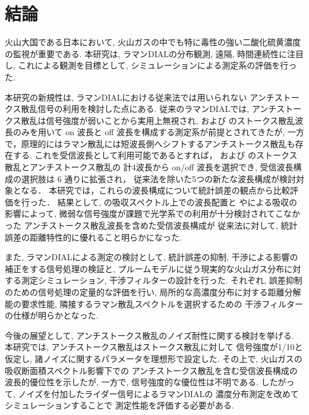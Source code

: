 { \setlength{\parskip}{0.7em}

\chapter[結論]{結論}\label{chapt6}

火山大国である日本において, 
火山ガスの中でも特に毒性の強い二酸化硫黄濃度の監視が重要である. 
本研究は, ラマンDIALの分布観測, 遠隔, 時間連続性に注目し, 
これによる観測を目標として, 
シミュレーションによる測定系の評価を行った. 

本研究の新規性は, ラマンDIALにおける従来法では用いられない
アンチストークス散乱信号の利用を検討した点にある. 
従来のラマンDIALでは, 
アンチストークス散乱は信号強度が弱いことから実用上無視され, 
 および  のストークス散乱波長のみを用いて 
on 波長と off 波長を構成する測定系が前提とされてきたが, 
一方で，原理的にはラマン散乱には短波長側へシフトするアンチストークス散乱も存在する. 
これを受信波長として利用可能であるとすれば，
 および  のストークス散乱とアンチストークス散乱の
計4波長から on/off 波長を選択でき, 受信波長構成の選択肢は 6 通りに拡張され，
従来法を除いた5つの新たな波長構成が検討対象となる．
本研究では，これらの波長構成について統計誤差の観点から比較評価を行った．
結果として, 
の吸収スペクトル上での波長配置と
やによる吸収の影響によって, 
微弱な信号強度が課題で光学系での利用が十分検討されてこなかった
アンチストークス散乱波長を含めた受信波長構成が
従来法に対して, 統計誤差の距離特性的に優れること明らかになった. 

また, ラマンDIALによる測定の検討として, 
統計誤差の抑制, 干渉による影響の補正をする信号処理の検証と, 
プルームモデルに従う現実的な火山ガス分布に対する測定シミュレーション, 
干渉フィルターの設計を行った. 
それぞれ, 誤差抑制のための信号処理の定量的な評価を行い, 
局所的な高濃度分布に対する距離分解能の要求性能, 
隣接するラマン散乱スペクトルを選択するための
干渉フィルターの仕様が明らかとなった. 

今後の展望として, 
アンチストークス散乱のノイズ耐性に関する検討を挙げる. 
本研究では, アンチストークス散乱はストークス散乱に対して
信号強度が1/10と仮定し, 
諸ノイズに関するパラメータを理想形で設定した. 
その上で, 火山ガスの吸収断面積スペクトル影響下での
アンチストークス散乱を含む受信波長構成の
波長的優位性を示したが, 
一方で, 信号強度的な優位性は不明である. 
したがって, ノイズを付加したライダー信号によるラマンDIALの
濃度分布測定を改めてシミュレーションすることで
測定性能を評価する必要がある. 



}
